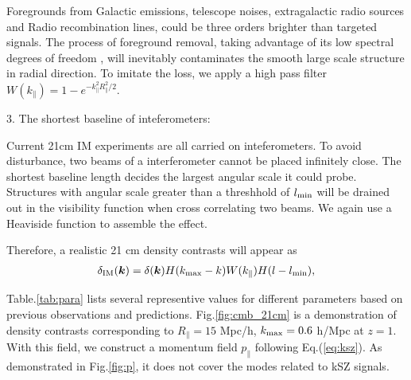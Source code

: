 Foregrounds from Galactic emissions, telescope noises, 
extragalactic radio sources and Radio recombination lines, 
could be three orders brighter than targeted signals\cite{DiMatteo04,Masui13}. 
The process of foreground removal, taking advantage of its low spectral
degrees of freedom \cite{Switzer15}, 
will inevitably contaminates the smooth large scale structure in radial direction.  
To imitate the loss, we apply a high pass filter $W(k_\parallel)=1-e^{-k_\parallel^2R_\parallel^2/2}$. 

3. The shortest baseline of inteferometers:

Current 21cm IM experiments are all carried on inteferometers. 
To avoid disturbance, two beams of a interferometer 
cannot be placed infinitely close. 
The shortest baseline length decides the largest 
angular scale it could probe.  
Structures with angular scale greater than a threshhold of 
$l_\mathrm{min}$ will be drained out 
in the visibility function 
when cross correlating two beams. 
We again use a Heaviside function to assemble the effect. 

Therefore, a realistic 21 cm density contrasts will appear as 
\begin{eqnarray}
\label{eq:ns}
    \delta_\mathrm{IM}(\bm{k})=\delta(\bm{k})H(k_\mathrm{max}-k)W(k_\parallel)H(l-l_\mathrm{min}),
\end{eqnarray}

Table.\ref{tab:para} 
lists several representive values for different parameters 
based on previous observations and predictions. 
Fig.\ref{fig:cmb_21cm} 
is a demonstration of density contrasts corresponding to 
$R_\parallel=15$ Mpc/h, $k_\mathrm{max}=0.6$ h/Mpc 
at $z=1$. 
With this field, 
we construct a momentum field $p_\parallel$ following Eq.(\ref{eq:ksz}). 
As demonstrated in Fig.\ref{fig:p}, 
it does not cover the modes related to kSZ signals. 


